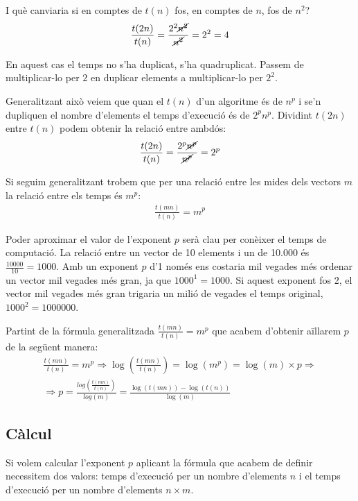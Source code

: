 I què canviaria si en comptes de $t(n)$ fos, en comptes de $n$, fos de $n^2$?
\begin{gather*}
	\frac{t(2n)}{t(n)} = \frac{2^2 \cancel{n^2}}{ \cancel{n^2}} = 2^2 = 4
\end{gather*}

En aquest cas el temps no s'ha duplicat, s'ha quadruplicat. Passem de multiplicar-lo per $2$ en duplicar elements a multiplicar-lo per $2^2$.

Generalitzant això veiem que quan el $t(n)$ d'un algoritme és de $n^p$ i se'n dupliquen el nombre d'elements el temps d'execució és de $2^p n^p$.
Dividint $t(2n)$ entre $t(n)$ podem obtenir la relació entre ambdós:
\begin{gather*}
	\frac{t(2n)}{t(n)} = \frac{2^p \cancel{n^p}}{\cancel{n^p}} = 2^p
\end{gather*}

Si seguim generalitzant trobem que per una relació entre les mides dels vectors $m$ la relació entre els temps és $m^p$:
\begin{gather*}
	\frac{t(mn)}{t(n)} = m^p
\end{gather*}

Poder aproximar el valor de l'exponent $p$ serà clau per conèixer el temps de computació.
La relació entre un vector de 10 elements i un de 10.000 és $\frac{10000}{10} = 1000$. Amb un exponent $p$ d'1 només ens costaria mil vegades més ordenar un vector mil vegades més gran, ja que $1000^1 = 1000$.
Si aquest exponent fos 2, el vector mil vegades més gran trigaria un milió de vegades el temps original, $1000^2 = 1000000$.

Partint de la fórmula generalitzada $\frac{t(mn)}{t(n)} = m^p
$ que acabem d'obtenir aïllarem $p$ de la següent manera:
\begin{gather*}
	\frac{t(mn)}{t(n)} = m^p \Rightarrow \log\left(\frac{t(mn)}{t(n)}\right) = \log (m^p) = \log(m) \times p \Rightarrow \\
	\Rightarrow p = \frac{log\left(\frac{t(mn)}{t(n)}\right)}{log(m)} = \frac{\log(t(mn))-\log(t(n))}{\log(m)}
\end{gather*}

\subsection{Càlcul}
Si volem calcular l'exponent $p$ aplicant la fórmula que acabem de definir necessitem dos valors: temps d'execució per un nombre d'elements $n$ i el temps d'execució per un nombre d'elements $n \times m$.

